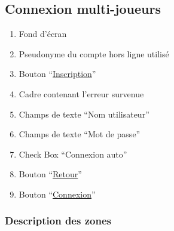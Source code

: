 \documentclass{report}
\begin{document}
\newpage

	\subsection{Connexion multi-joueurs}
	
		\hypertarget{Connexion multi-joueurs}{}
		\label{Connexion multi-joueurs}
	
		\begin{center}
					
		\end{center}
		
		\begin{enumerate}
		  \item Fond d'écran
		  \item Pseudonyme du compte hors ligne utilisé
		  \item Bouton ``\hyperlink{Creation compte multi-joueurs}{Inscription}''
		  \item Cadre contenant l'erreur survenue
		  \item Champs de texte ``Nom utilisateur''
		  \item Champs de texte ``Mot de passe''
		  \item Check Box ``Connexion auto''
		  \item Bouton ``\hyperlink{Page d'accueil}{Retour}''
		  \item Bouton ``\hyperlink{Accueil multi-joueurs}{Connexion}''
		\end{enumerate}

		\subsubsection{Description des zones}
		
\end{document}
